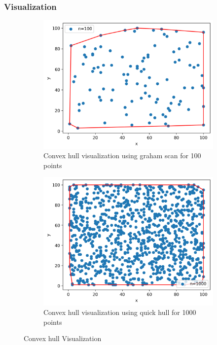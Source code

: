 \subsubsection*{Visualization}

\begin{figure}[H]
    \centering
    \begin{subfigure}[b]{0.5\textwidth}
        \centering
        \includegraphics[width=\textwidth]{./img/lab2/convex_100pt.png}
        \caption{Convex hull visualization using graham scan for 100 points}
    \end{subfigure}
    \hfill
    \begin{subfigure}[b]{0.5\textwidth}
        \centering
        \includegraphics[width=\textwidth]{./img/lab2/convex_1kpt.png}
        \caption{Convex hull visualization using quick hull for 1000 points}
    \end{subfigure}
    
    \caption{Convex hull Visualization}
    \label{fig:task2}
\end{figure}
